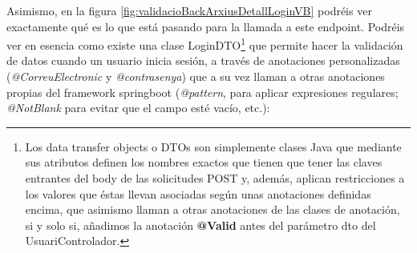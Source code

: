 \documentclass[a4paper,12pt]{report}
\begin{document}
			
			 Asimismo, en la figura  \ref{fig:validacioBackArxiusDetallLoginVB} podréis ver exactamente qué es lo que está pasando para la llamada a este endpoint. Podréis ver en esencia como existe una clase LoginDTO\footnote{Los data transfer objects o DTOs son simplemente clases Java que mediante sus atributos definen los nombres exactos que tienen que tener las claves entrantes del body de las solicitudes POST y, además, aplican restricciones a los valores que éstas llevan asociadas según unas anotaciones definidas encima, que asimismo llaman a otras anotaciones de las clases de anotación, si y solo si, añadimos la anotación \textbf{@Valid} antes del parámetro dto del UsuariControlador.} que permite hacer la validación de datos cuando un usuario inicia sesión, a través de anotaciones personalizadas (\textit{@CorreuElectronic} y \textit{@contrasenya}) que a su vez llaman a otras anotaciones propias del framework springboot (\textit{@pattern}, para aplicar expresiones regulares; \textit{@NotBlank} para evitar que el campo esté vacío, etc.):
			
			
			

			
			
\end{document}
